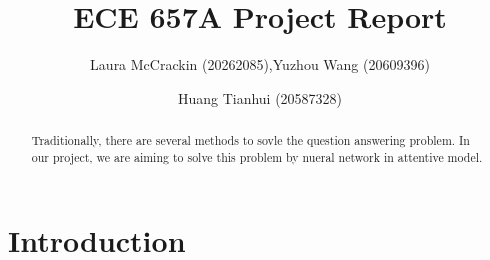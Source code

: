 \documentclass[runningheads,a4paper]{llncs}
\newcommand{\commentontext}[2]{\colorbox{yellow!60}{#1}\pdfcomment[color={0.234 0.867 0.211},hoffset=-6pt,voffset=10pt,opacity=0.5]{#2}}
\newcommand{\commentatside}[1]{\pdfcomment[color={0.045 0.278 0.643},icon=Note]{#1}}
\newcommand{\todo}[1]{\commentatside{#1}}
\begin{document}


\title{ECE 657A Project Report}

\author{Laura McCrackin (20262085),Yuzhou Wang (20609396) \and Huang Tianhui (20587328)}

%
\iffalse

\institute{
University of Waterloo\\
\email{...}\and
University of Waterloo\\
\email{...}
}
\fi
			
\maketitle
\begin{abstract}
Traditionally, there are several methods to sovle the question answering problem. In our project, we are aiming to solve this problem by nueral network in attentive model.
\end{abstract}



\section{Introduction}\label{sec:intro}

\end{document}
